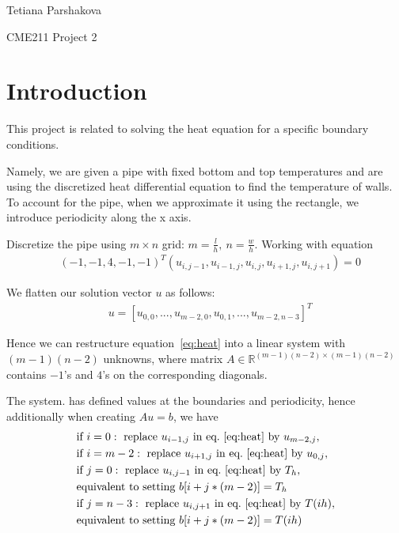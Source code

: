 \documentclass[12pt]{article}
\begin{document}
\begin{center}
    Tetiana Parshakova 
\end{center}
\begin{center}
    \Large CME211 Project 2
\end{center}

\section{Introduction}
This project is related to solving the heat equation for a specific boundary conditions.

Namely, we are given a pipe with fixed bottom and top temperatures and are using the discretized heat differential equation to find the temperature of walls. To account for the pipe, when we approximate it using the rectangle, we introduce periodicity along the x axis.


Discretize the pipe using $m \times n$ grid: $m=\frac{l}{h}, \ n=\frac{w}{h}$.
Working with equation
\begin{align}\label{eq:heat}
    & (-1, -1, 4, -1, -1)^T (u_{i,j-1}, u_{i-1,j}, u_{i,j}, u_{i+1,j}, u_{i,j+1}) = 0
\end{align}

We flatten our solution vector $u$ as follows:
\begin{align*}
    & u = [u_{0,0}, ..., u_{m-2, 0}, u_{0,1}, ..., u_{m-2,n-3}]^T
\end{align*}

Hence we can restructure equation~\ref{eq:heat} into a linear system with $(m-1)(n-2)$ unknowns, where matrix $A \in \mathbb{R}^{(m-1)(n-2)\times (m-1)(n-2)}$ contains $-1$'s and $4$'s on the corresponding diagonals.

The system. has defined values at the boundaries and periodicity, hence additionally when creating $Au=b$,  we have
\begin{align*}
    & \text{if } i=0: \ \text{replace } u_{i-1,j} \text{ in eq.~\ref{eq:heat} by } u_{m-2,j}, \\
    & \text{if } i=m-2: \ \text{replace } u_{i+1,j} \text{ in eq.~\ref{eq:heat} by } u_{0,j}, \\
    & \text{if } j=0: \ \text{replace } u_{i,j-1} \text{ in eq.~\ref{eq:heat} by } T_h, \\
    & \text{equivalent to setting } b[i+j*(m-2)]=T_h\\
    & \text{if } j=n-3: \ \text{replace } u_{i,j+1} \text{ in eq.~\ref{eq:heat} by } T(ih),\\
    & \text{equivalent to setting } b[i+j*(m-2)]=T(ih)\\
\end{align*}
\end{document}
